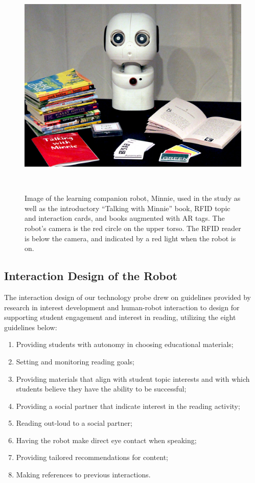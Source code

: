 \documentclass{sigchi}
\begin{document}
\begin{figure}
	\centering
	\includegraphics[width=\columnwidth]{figures/Complete-Minnie-System.jpg}
	\caption{Image of the learning companion robot, Minnie, used in the study as well as the introductory ``Talking with Minnie'' book, RFID topic and interaction cards, and books augmented with AR tags. The robot's camera is the red circle on the upper torso. The RFID reader is below the camera, and indicated by a red light when the robot is on. }~\label{fig:complete-system}\vspace{-16pt}
\end{figure}

\subsection{Interaction Design of the Robot}
The interaction design of our technology probe drew on guidelines provided by research in interest development and human-robot interaction to design for supporting student engagement and interest in reading, utilizing the eight guidelines below:

\begin{enumerate}
\setlength\itemsep{-0.5pt}
\item Providing students with autonomy in choosing educational materials;
\item Setting and monitoring reading goals;
\item Providing materials that align with student topic interests and with which students believe they have the ability to be successful;
\item Providing a social partner that indicate interest in the reading activity;
\item Reading out-loud to a social partner;
\item Having the robot make direct eye contact when speaking;
\item Providing tailored recommendations for content;
\item Making references to previous interactions. 
\end{enumerate}
\end{document}
